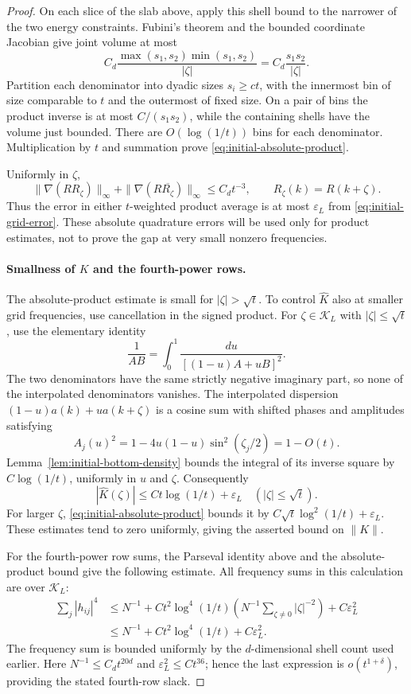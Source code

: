 \begin{proof}
On each slice of the slab above, apply this shell bound to the narrower
of the two energy constraints. Fubini's theorem
and the bounded coordinate Jacobian give joint volume at most
\[
 C_d\frac{\max(s_1,s_2)\min(s_1,s_2)}{|\zeta|}
       =C_d\frac{s_1s_2}{|\zeta|}.
\]
Partition each denominator into dyadic sizes $s_i\ge ct$, with the
innermost bin of size comparable to $t$ and the outermost of fixed
size. On a pair of bins the product inverse is at most
$C/(s_1s_2)$, while the containing shells have the volume just bounded.
There are $O(\log(1/t))$ bins for each denominator. Multiplication
by $t$ and summation prove \eqref{eq:initial-absolute-product}.

Uniformly in $\zeta$,
\[
 \|\nabla(RR_\zeta)\|_\infty+
 \|\nabla(R\overline{R_\zeta})\|_\infty\le C_dt^{-3},
 \qquad R_\zeta(k)=R(k+\zeta).
\]
Thus the error in either $t$-weighted product average is at most
$\varepsilon_L$ from \eqref{eq:initial-grid-error}. These absolute
quadrature errors will be used only for product estimates, not to
prove the gap at very small nonzero frequencies.

\paragraph{Smallness of $K$ and the fourth-power rows.}
The absolute-product estimate is small for $|\zeta|>\sqrt t$.
To control $\widehat K$ also at smaller grid frequencies, use cancellation
in the signed product. For $\zeta\in\mathcal K_L$ with
$|\zeta|\le\sqrt t$, use the elementary identity
\[
 \frac1{AB}=\int_0^1\frac{du}{[(1-u)A+uB]^2}.
\]
The two denominators have the same strictly negative imaginary part,
so none of the interpolated denominators vanishes.  The interpolated
dispersion $(1-u)a(k)+ua(k+\zeta)$ is a cosine sum with shifted phases
and amplitudes satisfying
\[
 A_j(u)^2=1-4u(1-u)\sin^2(\zeta_j/2)=1-O(t).
\]
Lemma~\ref{lem:initial-bottom-density} bounds the integral of its
inverse square by $C\log(1/t)$, uniformly in $u$ and $\zeta$.
Consequently
\[
 |\widehat K(\zeta)|\le Ct\log(1/t)+\varepsilon_L
       \quad (|\zeta|\le\sqrt t).
\]
For larger $\zeta$, \eqref{eq:initial-absolute-product} bounds it by
$C\sqrt t\log^2(1/t)+\varepsilon_L$.  These estimates tend to zero
uniformly, giving the asserted bound on $\|K\|$.

For the fourth-power row sums, the Parseval identity above and the
absolute-product bound give the following estimate. All frequency sums
in this calculation are over $\mathcal K_L$:
\begin{equation}\label{eq:initial-fourth-row}
 \begin{split}
 \sum_j|h_{ij}|^4
 &\le N^{-1}+Ct^2\log^4(1/t)
       \left(N^{-1}\sum_{\zeta\ne0}|\zeta|^{-2}\right)
       +C\varepsilon_L^2\\
 &\le N^{-1}+Ct^2\log^4(1/t)+C\varepsilon_L^2.
 \end{split}
\end{equation}
The frequency sum is bounded uniformly by the $d$-dimensional shell
count used earlier.  Here $N^{-1}\le C_dt^{20d}$ and
$\varepsilon_L^2\le Ct^{36}$; hence the last expression is
$o(t^{1+\delta})$, providing the stated fourth-row slack.


\end{proof}
